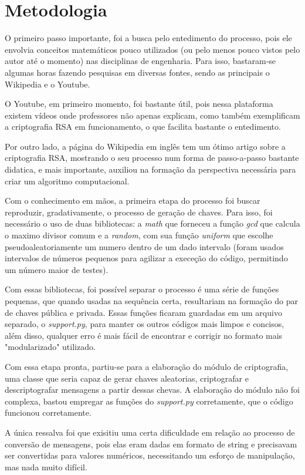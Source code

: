 \documentclass[12pt,A4]{report}
\begin{document}
\section{Metodologia}
O primeiro passo importante, foi a busca pelo entedimento do processo, pois ele envolvia conceitos matemáticos pouco utilizados (ou pelo menos pouco vistos pelo autor até o momento) nas disciplinas de engenharia. Para isso, bastaram-se algumas horas fazendo pesquisas em diversas fontes, sendo as principais o Wikipedia e o Youtube.

O Youtube, em primeiro momento, foi bastante útil, pois nessa plataforma existem vídeos onde professores não apenas explicam, como também exemplificam a criptografia RSA em funcionamento, o que facilita bastante o entedimento.

Por outro lado, a página do Wikipedia em inglês tem um ótimo artigo sobre a criptografia RSA, mostrando o seu processo num forma de passo-a-passo bastante didatica, e mais importante, auxiliou na formação da perspectiva necessária para criar um algoritmo computacional.

Com o conhecimento em mãos, a primeira etapa do processo foi buscar reproduzir, gradativamente, o processo de geração de chaves. Para isso, foi necessário o uso de duas bibliotecas: a \textit{math} que forneceu a função \textit{gcd} que calcula o maximo divisor comum e a \textit{random}, com sua função \textit{uniform} que escolhe pseudoaleatoriamente um numero dentro de um dado intervalo (foram usados intervalos de números pequenos para agilizar a execeção do código, permitindo um número maior de testes).

Com essas bibliotecas, foi possível separar o processo é uma série de funções pequenas, que quando usadas na sequência certa, resultariam na formação do par de chaves pública e privada. Essas funções ficaram guardadas em um arquivo separado, o \textit{support.py}, para manter os outros códigos mais limpos e concisos, além disso, qualquer erro é mais fácil de encontrar e corrigir no formato mais "modularizado" utilizado.

Com essa etapa pronta, partiu-se para a elaboração do módulo de criptografia, uma classe que seria capaz de gerar chaves aleatorias, criptografar e descriptografar mensagens a partir dessas chevas. A elaboração do módulo não foi complexa, bastou empregar as funções do \textit{support.py} corretamente, que o código funcionou corretamente. 

A única ressalva foi que exisitiu uma certa dificuldade em relação ao processo de conversão de mensagens, pois elas eram dadas em formato de string e precisavam ser convertidas para valores numéricos, necessitando um esforço de manipulação, mas nada muito difícil.
\end{document}
